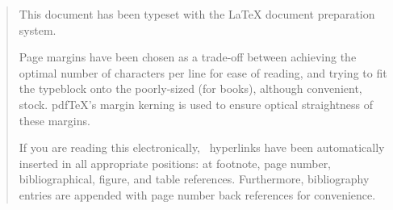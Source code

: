 \vfill
\begin{quotation}
  \noindent This document has been typeset with the \LaTeX{} document
  preparation system.

  Page margins have been chosen as a trade-off between achieving the
  optimal number of characters per line for ease of reading, and trying 
  to fit the typeblock onto the poorly-sized (for books), although 
  convenient,  stock.
  pdf\/\TeX's margin kerning is used to ensure optical straightness of these 
  margins.

  If you are reading this electronically, \PDF\ hyperlinks have
  been automatically inserted in all appropriate positions: at
  footnote, page number, bibliographical, figure, and table
  references. Furthermore, bibliography entries are appended with page
  number back references for convenience.
\end{quotation}
\vfill